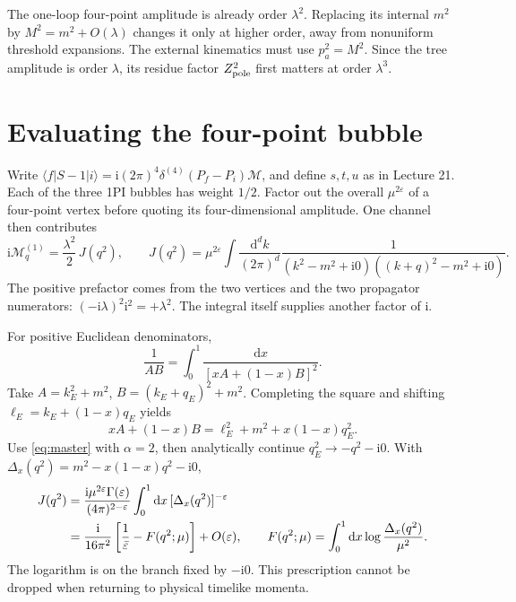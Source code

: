 \documentclass[11pt]{article}
\newcommand{\dd}{\mathrm d}
\newcommand{\ii}{\mathrm i}
\newcommand{\eps}{\varepsilon}
\newcommand{\module}[1]{\clearpage\section{#1}}
\begin{document}
\begin{remarkbox}
The one-loop four-point amplitude is already order \(\lambda^2\).
Replacing its internal \(m^2\) by \(M^2=m^2+O(\lambda)\) changes it
only at higher order, away from nonuniform threshold expansions.
The external kinematics must use \(p_a^2=M^2\).
Since the tree amplitude is order \(\lambda\), its residue factor
\(Z_{\rm pole}^2\) first matters at order \(\lambda^3\).
\end{remarkbox}

\module{Evaluating the four-point bubble}
Write \(\langle f|S-1|i\rangle=\ii(2\pi)^4\delta^{(4)}(P_f-P_i)
\mathcal M\), and define \(s,t,u\) as in Lecture 21. Each of the three
1PI bubbles has weight \(1/2\). Factor out the overall
\(\mu^{2\eps}\) of a four-point vertex before quoting its
four-dimensional amplitude. One channel then contributes
\begin{equation}
 \ii\mathcal M_q^{(1)}=\frac{\lambda^2}{2}\,J(q^2),\qquad
 J(q^2)=\mu^{2\eps}\int\frac{\dd^dk}{(2\pi)^d}
 \frac{1}{(k^2-m^2+\ii0)((k+q)^2-m^2+\ii0)}.
 \label{eq:bubbleintegral}
\end{equation}
The positive prefactor comes from the two vertices and the two
propagator numerators: \((-\ii\lambda)^2\ii^2=+\lambda^2\).
The integral itself supplies another factor of \(\ii\).

For positive Euclidean denominators,
\begin{equation}
 \frac1{AB}=\int_0^1\frac{\dd x}{[xA+(1-x)B]^2}.
\end{equation}
Take \(A=k_E^2+m^2\), \(B=(k_E+q_E)^2+m^2\). Completing the square
and shifting \(\ell_E=k_E+(1-x)q_E\) yields
\begin{equation}
 xA+(1-x)B=\ell_E^2+m^2+x(1-x)q_E^2.
\end{equation}
Use \eqref{eq:master} with \(\alpha=2\), then analytically continue
\(q_E^2\to-q^2-\ii0\). With
\(\Delta_x(q^2)=m^2-x(1-x)q^2-\ii0\),
\begin{align}
 J(q^2)&=\frac{\ii\mu^{2\eps}\Gamma(\eps)}{(4\pi)^{2-\eps}}
 \int_0^1\dd x\,[\Delta_x(q^2)]^{-\eps}\notag\\
 &=\frac{\ii}{16\pi^2}\left[\frac1{\bar\eps}-F(q^2;\mu)\right]
 +O(\eps),\qquad
 F(q^2;\mu)=\int_0^1\dd x\log\frac{\Delta_x(q^2)}{\mu^2}.
 \label{eq:bubbleanswer}
\end{align}
The logarithm is on the branch fixed by \(-\ii0\). This prescription
cannot be dropped when returning to physical timelike momenta.
\end{document}
